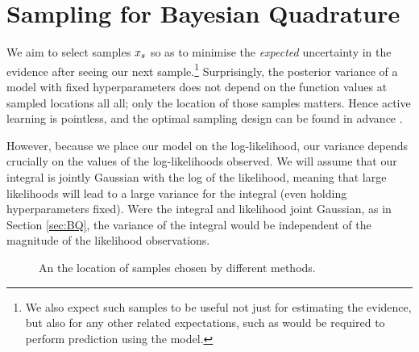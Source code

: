 \documentclass{article}
\newlength\fheight  %
\newlength\fwidth
\begin{document}
\section{Sampling for Bayesian Quadrature}

We aim to select samples $\lfv_s$ so as to minimise the \textit{expected} uncertainty in the evidence after seeing our next sample.\footnote{We also expect such samples to be useful not just for estimating the evidence, but also for any other related expectations, such as would be required to perform prediction using the model.}
Surprisingly, the posterior variance of a \gpb model with fixed hyperparameters does not depend on the function values at sampled locations all all; only the location of those samples matters. Hence active learning is pointless, and the optimal sampling design can be found in advance \cite{minka2000dqr}.

However, because we place our \gpb model on the log-likelihood, our variance depends crucially on the values of the log-likelihoods observed. We will assume that our integral is jointly Gaussian with the log of the likelihood, meaning that large likelihoods will lead to a large variance for the integral (even holding hyperparameters fixed). Were the integral and likelihood joint Gaussian, as in Section \ref{sec:BQ}, the variance of the integral would be independent of the magnitude of the likelihood observations.

% 

\begin{figure}
\centering
\setlength\fheight{4cm}
\setlength\fwidth{5cm}

\caption{An the location of samples chosen by different methods.}
\label{fig:sample_paths}
\end{figure}
\end{document}
